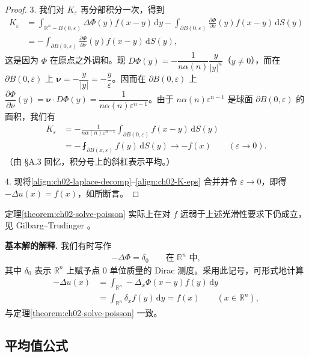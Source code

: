 \documentclass[../../main.tex]{subfiles}
\begin{document}
\begin{proof}
3. 我们对 $K_\varepsilon$ 再分部积分一次，得到
\begin{align*}
K_\varepsilon&=\int_{\mathbb{R}^n-B(0,\varepsilon)}\Delta\Phi(y)f(x-y)\,\mathrm{d}y
-\int_{\partial B(0,\varepsilon)}\frac{\partial\Phi}{\partial\nu}(y)f(x-y)\,\mathrm{d}S(y)\\
&=-\int_{\partial B(0,\varepsilon)}\frac{\partial\Phi}{\partial\nu}(y)f(x-y)\,\mathrm{d}S(y),
\end{align*}
这是因为 $\Phi$ 在原点之外调和。现 $D\Phi(y)=-\dfrac{1}{n\alpha(n)}\dfrac{y}{|y|^n}$（$y\neq 0$），而在 $\partial B(0,\varepsilon)$ 上 $\boldsymbol{\nu}=-\dfrac{y}{|y|}=-\dfrac{y}{\varepsilon}$。因而在 $\partial B(0,\varepsilon)$ 上 $\dfrac{\partial\Phi}{\partial\nu}(y)=\boldsymbol{\nu}\cdot D\Phi(y)=\dfrac{1}{n\alpha(n)\varepsilon^{n-1}}$。由于 $n\alpha(n)\varepsilon^{n-1}$ 是球面 $\partial B(0,\varepsilon)$ 的面积，我们有
\begin{align}\label{align:ch02-K-eps}
K_\varepsilon&=-\frac{1}{n\alpha(n)\varepsilon^{n-1}}\int_{\partial B(0,\varepsilon)}f(x-y)\,\mathrm{d}S(y)\\
&=-\fint_{\partial B(x,\varepsilon)}f(y)\,\mathrm{d}S(y)\to -f(x)\qquad (\varepsilon\to 0).\nonumber
\end{align}
（由 \S A.3 回忆，积分号上的斜杠表示平均。）

4. 现将\eqref{align:ch02-laplace-decomp}--\eqref{align:ch02-K-eps} 合并并令 $\varepsilon\to 0$，即得 $-\Delta u(x)=f(x)$，如所断言。
\end{proof}

定理\cref{theorem:ch02-solve-poisson} 实际上在对 $f$ 远弱于上述光滑性要求下仍成立，见 Gilbarg--Trudinger \cite{G-T}。

\textbf{基本解的解释.} 我们有时写作
\begin{align*}
-\Delta\Phi=\delta_0 \qquad \text{在 }\mathbb{R}^n\text{ 中},
\end{align*}
其中 $\delta_0$ 表示 $\mathbb{R}^n$ 上赋予点 $0$ 单位质量的 Dirac 测度。采用此记号，可形式地计算
\begin{align*}
-\Delta u(x)&=\int_{\mathbb{R}^n}-\Delta_x\Phi(x-y)f(y)\,\mathrm{d}y\\
&=\int_{\mathbb{R}^n}\delta_x f(y)\,\mathrm{d}y=f(x)\qquad (x\in\mathbb{R}^n),
\end{align*}
与定理\cref{theorem:ch02-solve-poisson} 一致。

\subsection{平均值公式}\label{subsection:ch02-meanvalue}
\end{document}
